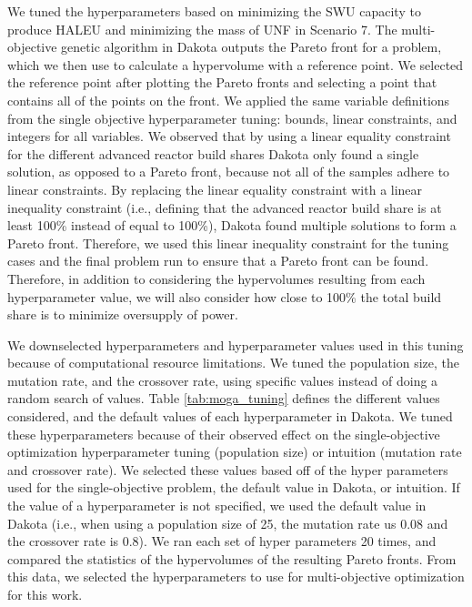 We tuned the hyperparameters based on minimizing the \gls{SWU} capacity 
to produce \gls{HALEU} and minimizing the mass of \gls{UNF} in Scenario 7.
The multi-objective genetic algorithm in Dakota outputs the Pareto front 
for a problem, which we then use to calculate a hypervolume with a 
reference point. We selected the reference point after plotting the 
Pareto fronts and selecting a point that contains all of the points on 
the front. We applied the same variable definitions 
from the single objective hyperparameter 
tuning: bounds, linear constraints, and integers for 
all variables. We observed that by using a linear equality constraint for 
the different advanced reactor build shares 
Dakota only found a single solution, as opposed to a Pareto front, because 
not all of the samples adhere to linear constraints. By replacing the 
linear equality constraint with a linear 
inequality constraint (i.e., defining that the advanced reactor build share is 
at least 100\% instead of equal to 100\%), Dakota found multiple 
solutions to form a Pareto front. 
Therefore, we used this linear inequality constraint for the tuning cases and 
the final problem run to ensure that a Pareto front can be found. Therefore, 
in addition to considering the hypervolumes resulting from each hyperparameter 
value, we will also consider how close to 100\% the total build share is 
to minimize oversupply of power.

We downselected hyperparameters and hyperparameter values used in this 
tuning because of computational resource limitations. We tuned the 
population size, the mutation rate, and the crossover rate, using 
specific values instead of doing a random 
search of values. 
Table \ref{tab:moga_tuning} defines the different values considered, 
and the default values of each hyperparameter in Dakota. 
We tuned these hyperparameters because of their observed effect 
on the single-objective optimization hyperparameter tuning 
(population size) or intuition (mutation rate and crossover rate).
We selected these values 
based off of the hyper parameters used for the single-objective 
problem, the default value in Dakota, or intuition. If the value of a 
hyperparameter is not specified, we used the default value in Dakota
(i.e., when using a population size of 25, the mutation rate 
us 0.08 and the crossover rate is 0.8).
We ran each set of hyper 
parameters 20 times, and compared the statistics of the hypervolumes of 
the resulting Pareto fronts. From this data, we selected the 
hyperparameters to use for multi-objective optimization for this work. 

